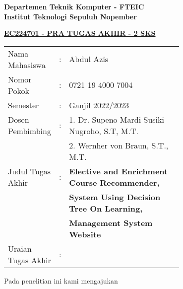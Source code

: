 \begin{flushleft}
  \textbf{Departemen Teknik Komputer - FTEIC}\\
  \textbf{Institut Teknologi Sepuluh Nopember}\\
\end{flushleft}

\begin{center}
  \underline{\textbf{EC224701 - PRA TUGAS AKHIR - 2 SKS}}
\end{center}

\begin{adjustwidth}{-0.2cm}{}
  \begin{tabular}{lcp{0.7\linewidth}}

    Nama Mahasiswa     & : & Abdul Azis                                            \\
    Nomor Pokok        & : & 0721 19 4000 7004                                     \\

    Semester           & : & Ganjil 2022/2023                                      \\

    Dosen Pembimbing   & : & 1. Dr. Supeno Mardi Susiki Nugroho, S.T, M.T.         \\
                       &   & 2. Wernher von Braun, S.T., M.T.                      \\
    Judul Tugas Akhir  & : & \textbf{Elective and Enrichment Course Recommender, } \\
                       &   & \textbf{System Using Decision Tree On Learning,}      \\
                       &   & \textbf{Management System Website}                    \\

    Uraian Tugas Akhir & : &                                                       \\
  \end{tabular}
\end{adjustwidth}

Pada penelitian ini kami mengajukan \lipsum[1][1-10]
\vspace{1ex}

